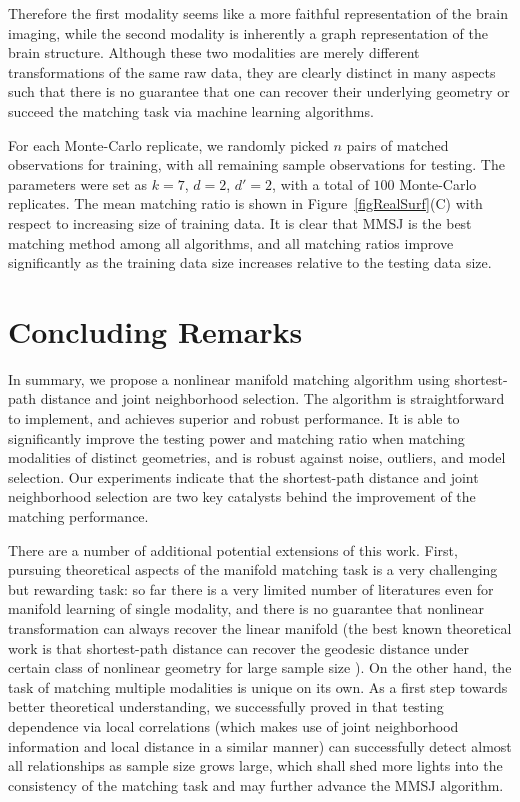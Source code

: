 \documentclass[times,twocolumn,final]{elsarticle}
\begin{document}
Therefore the first modality seems like a more faithful representation of the brain imaging, while the second modality is inherently a graph representation of the brain structure. Although these two modalities are merely different transformations of the same raw data, they are clearly distinct in many aspects such that there is no guarantee that one can recover their underlying geometry or succeed the matching task via machine learning algorithms.

For each Monte-Carlo replicate, we randomly picked $n$ pairs of matched observations for training, with all remaining sample observations for testing. The parameters were set as $k=7$, $d=2$, $d'=2$, with a total of $100$ Monte-Carlo replicates. The mean matching ratio is shown in Figure~\ref{figRealSurf}(C) with respect to increasing size of training data. It is clear that MMSJ is the best matching method among all algorithms, and all matching ratios improve significantly as the training data size increases relative to the testing data size.

\section{Concluding Remarks}
\label{conclu}
In summary, we propose a nonlinear manifold matching algorithm using shortest-path distance and joint neighborhood selection. The algorithm is straightforward to implement, and achieves superior and robust performance. It is able to significantly improve the testing power and matching ratio when matching modalities of distinct geometries, and is robust against noise, outliers, and model selection. Our experiments indicate that the shortest-path distance and joint neighborhood selection are two key catalysts behind the improvement of the matching performance.

There are a number of additional potential extensions of this work. First, pursuing theoretical aspects of the manifold matching task is a very challenging but rewarding task: so far there is a very limited number of literatures even for manifold learning of single modality, and there is no guarantee that nonlinear transformation can always recover the linear manifold (the best known theoretical work is that shortest-path distance can recover the geodesic distance under certain class of nonlinear geometry for large sample size \citep{SilvaTenenbaum2002}). On the other hand, the task of matching multiple modalities is unique on its own. As a first step towards better theoretical understanding, we successfully proved in \cite{ShenEtAl2017} that testing dependence via local correlations (which makes use of joint neighborhood information and local distance in a similar manner) can successfully detect almost all relationships as sample size grows large, which shall shed more lights into the consistency of the matching task and may further advance the MMSJ algorithm.
\end{document}
